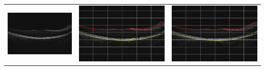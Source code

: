 \documentclass[12pt,a4paper]{scrartcl}
\begin{document}
\begin{table}[H]
\begin{tabular}{ | m{5cm} | m{5cm} | m{5cm} | }
\begin{minipage}{.3\textwidth}
    \end{minipage}
    \\ \hline%
    \begin{minipage}{.3\textwidth}
      \includegraphics[width=\linewidth]{./images/TableOCT/base4.jpeg}
    \end{minipage}
    &
     \begin{minipage}{.3\textwidth}
      \includegraphics[width=\linewidth]{./images/TableOCT/ILM_BM_4.png}
    \end{minipage}
    & 
    \begin{minipage}{.3\textwidth}
      \includegraphics[width=\linewidth]{./images/TableOCT/ILM_BM_4_10_15.png}

\end{minipage}
\end{tabular}
\end{table}
\end{document}
